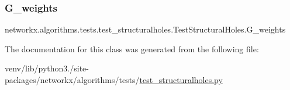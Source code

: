 \subsubsection{\texorpdfstring{G\+\_\+weights}{G\_weights}}
{\footnotesize\ttfamily networkx.\+algorithms.\+tests.\+test\+\_\+structuralholes.\+Test\+Structural\+Holes.\+G\+\_\+weights}



The documentation for this class was generated from the following file\+:\begin{DoxyCompactItemize}
\item 
venv/lib/python3./site-\/packages/networkx/algorithms/tests/\hyperlink{test__structuralholes_8py}{test\+\_\+structuralholes.\+py}\end{DoxyCompactItemize}
